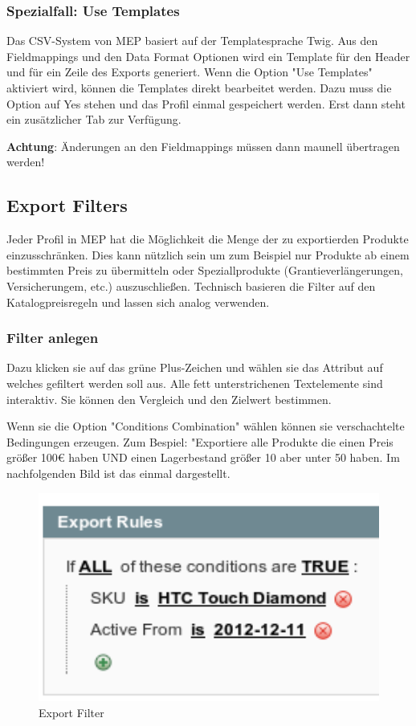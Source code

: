 \documentclass[a4paper,12pt]{book}
\begin{document}
\subsubsection{Spezialfall: Use Templates}
\label{sec:templates}

Das CSV-System von MEP basiert auf der Templatesprache Twig. Aus den
Fieldmappings und den Data Format Optionen wird ein Template für den
Header und für ein Zeile des Exports generiert. Wenn die Option "Use
Templates" aktiviert wird, können die Templates direkt bearbeitet
werden. Dazu muss die Option auf Yes stehen und das Profil einmal
gespeichert werden. Erst dann steht ein zusätzlicher Tab zur Verfügung.

\textbf{Achtung}: Änderungen an den Fieldmappings müssen dann maunell
übertragen werden!

\subsection{Export Filters}
\label{sec:filter}
Jeder Profil in MEP hat die Möglichkeit die Menge der zu exportierden
Produkte einzusschränken. Dies kann nützlich sein um zum Beispiel nur
Produkte ab einem bestimmten Preis zu übermitteln oder
Speziallprodukte (Grantieverlängerungen, Versicherungem, etc.)
auszuschließen. Technisch basieren die Filter auf den
Katalogpreisregeln und lassen sich analog verwenden.

\subsubsection{Filter anlegen}
\label{sec:filter_create}
Dazu klicken sie auf das grüne Plus-Zeichen und wählen sie das
Attribut auf welches gefiltert werden soll aus. Alle fett
unterstrichenen Textelemente sind interaktiv. Sie können den Vergleich
und den Zielwert bestimmen.

Wenn sie die Option "Conditions Combination" wählen können sie
verschachtelte Bedingungen erzeugen. Zum Bespiel: "Exportiere alle
Produkte die einen Preis größer 100\euro{} haben UND einen Lagerbestand
größer 10 aber unter 50 haben. Im nachfolgenden Bild ist das einmal
dargestellt.

\begin{figure}
 \includegraphics[width=1\textwidth]{img/bild08.png}
  \caption{Export Filter}
  \label{figure:export_filter}
\end{figure}
\end{document}
